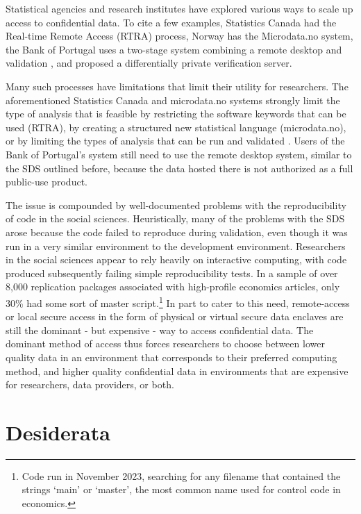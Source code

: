 \documentclass[]{hdsr}
\begin{document}
Statistical agencies and research institutes have explored various ways to scale up access to confidential data. To cite a few examples, Statistics Canada had the Real-time Remote Access (RTRA) process, Norway has the Microdata.no system, the Bank of Portugal uses a two-stage system combining a remote desktop and validation \citep{guimaraes_reproducibility_2023}, and \citet{barrientos_providing_2018} proposed a differentially private verification server. 

Many such processes have limitations that limit their utility for researchers. The aforementioned Statistics Canada and microdata.no systems strongly limit the type of analysis that is feasible by restricting the software keywords that can be used (RTRA), by creating a structured new statistical language (microdata.no), or by limiting the types of analysis that can be run and validated \citep{barrientos_providing_2018}. Users of the Bank of Portugal's system still need to use the remote desktop system, similar to the SDS outlined before, because the data hosted there is not authorized as a full public-use product.

The issue is compounded by well-documented problems with the reproducibility of code in the social sciences. Heuristically, many of the problems with the SDS arose because the code failed to reproduce during validation, even though it was  run in a very similar environment to the development environment. Researchers in the social sciences appear to rely heavily on interactive computing, with code produced subsequently failing simple reproducibility tests. In a sample of over 8,000 replication packages associated with high-profile economics articles, only 30\% had some sort of master script.\footnote{Code run in November 2023, searching for any filename that contained the strings `main' or `master', the most common name used for control code in economics.} In part to cater to this need, remote-access or local secure access in the form of physical or virtual secure data enclaves are still the dominant - but expensive - way to access confidential data. The dominant method of access thus forces researchers to choose between lower quality data in an environment that corresponds to their preferred computing method, and higher quality confidential data in environments that are expensive for researchers, data providers, or both.

\section{Desiderata}
\label{sec:desiderata}
\end{document}
